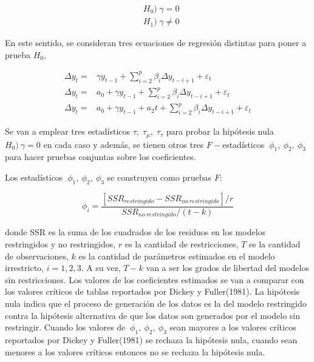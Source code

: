 \begin{align*}
&H_0)\; \gamma = 0\\
&H_1)\; \gamma \neq 0   
\end{align*}

En este sentido, se consideran tres ecuaciones de regresión distintas para poner a prueba $H_0$,

\begin{align}
\label{eq: 4_23}
\Delta y_t=&\gamma y_{t-1} + \sum_{i=2}^p \beta_i \Delta y_{t-i+1} + \varepsilon_t \\
\label{eq: 4_24}
\Delta y_t=&a_0+\gamma y_{t-1} + \sum_{i=2}^p \beta_i \Delta y_{t-i+1} + \varepsilon_t \\
\label{eq: 4_25}
\Delta y_t=&a_0+\gamma y_{t-1} + a_2 t+ \sum_{i=2}^p \beta_i \Delta y_{t-i+1} + \varepsilon_t
\end{align}

Se van a emplear tres estadísticos $\tau,\;\tau_{\mu},\;\tau_{\tau}$ para probar la hipótesis nula $H_0)\:\gamma=0$ en cada caso y además, se tienen otros tres $F-$estadísticos $\:\phi_1,\:\phi_2,\:\phi_3$ para hacer pruebas conjuntas sobre los coeficientes.  

Los estadísticos $\:\phi_1,\:\phi_2,\:\phi_3$ se construyen como pruebas $F$:

\begin{equation*}
\phi_{i}=\frac{\left[SSR_{restringido}-SSR_{no\:restringido}\right]/r}{SSR_{no\:restringido}/(t-k)}    
\end{equation*}

donde SSR es la suma de los cuadrados de los residuos en los modelos restringidos y no restringidos, $r$ es la cantidad de restricciones, $T$ es la cantidad de observaciones,  $k$ es la cantidad de parámetros estimados en el modelo irrestricto, $i=1,2,3$. A su vez, $T-k$ van a ser los grados de libertad del modelos sin restricciones. Los valores de los coeficientes estimados se van a comparar con los valores críticos de tablas reportados por Dickey y Fuller(1981).
La hipótesis nula indica que el proceso de generación de los datos es la del modelo restringido contra la hipótesis alternativa de que los datos son generados por el modelo sin restringir. Cuando los valores de $\:\phi_1,\:\phi_2,\:\phi_3$ sean mayores a los valores críticos reportados por Dickey y Fuller(1981) se rechaza la hipótesis nula, cuando sean menores a los valores críticos entonces no se rechaza la hipótesis nula.



